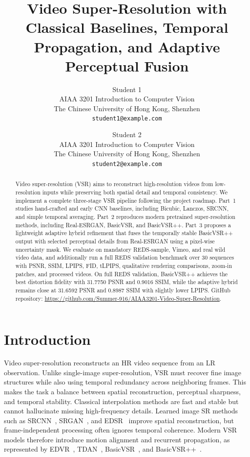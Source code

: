 \documentclass[10pt,twocolumn,letterpaper]{article}
\title{Video Super-Resolution with Classical Baselines, Temporal Propagation, and Adaptive Perceptual Fusion}
\author{Student 1\\
AIAA 3201 Introduction to Computer Vision\\
The Chinese University of Hong Kong, Shenzhen\\
{\tt\small student1@example.com}
\and
Student 2\\
AIAA 3201 Introduction to Computer Vision\\
The Chinese University of Hong Kong, Shenzhen\\
{\tt\small student2@example.com}
}
\begin{document}
\maketitle
\begin{abstract}
Video super-resolution (VSR) aims to reconstruct high-resolution videos from low-resolution inputs while preserving both spatial detail and temporal consistency. We implement a complete three-stage VSR pipeline following the project roadmap. Part~1 studies hand-crafted and early CNN baselines, including Bicubic, Lanczos, SRCNN, and simple temporal averaging. Part~2 reproduces modern pretrained super-resolution methods, including Real-ESRGAN, BasicVSR, and BasicVSR++. Part~3 proposes a lightweight adaptive hybrid refinement that fuses the temporally stable BasicVSR++ output with selected perceptual details from Real-ESRGAN using a pixel-wise uncertainty mask. We evaluate on mandatory REDS-sample, Vimeo, and real wild video data, and additionally run a full REDS validation benchmark over 30 sequences with PSNR, SSIM, LPIPS, FID, tLPIPS, qualitative rendering comparisons, zoom-in patches, and processed videos. On full REDS validation, BasicVSR++ achieves the best distortion fidelity with 31.7750 PSNR and 0.9016 SSIM, while the adaptive hybrid remains close at 31.6592 PSNR and 0.8987 SSIM with slightly lower LPIPS. GitHub repository: \url{https://github.com/Summer-916/AIAA3201-Video-Super-Resolution}.
\end{abstract}

\section{Introduction}
Video super-resolution reconstructs an HR video sequence from an LR observation. Unlike single-image super-resolution, VSR must recover fine image structures while also using temporal redundancy across neighboring frames. This makes the task a balance between spatial reconstruction, perceptual sharpness, and temporal stability. Classical interpolation methods are fast and stable but cannot hallucinate missing high-frequency details. Learned image SR methods such as SRCNN~\cite{dong2015srcnn}, SRGAN~\cite{ledig2017srgan}, and EDSR~\cite{lim2017edsr} improve spatial reconstruction, but frame-independent processing often ignores temporal coherence. Modern VSR models therefore introduce motion alignment and recurrent propagation, as represented by EDVR~\cite{wang2019edvr}, TDAN~\cite{tian2020tdan}, BasicVSR~\cite{chan2021basicvsr}, and BasicVSR++~\cite{chan2022basicvsrpp}.
\end{document}
